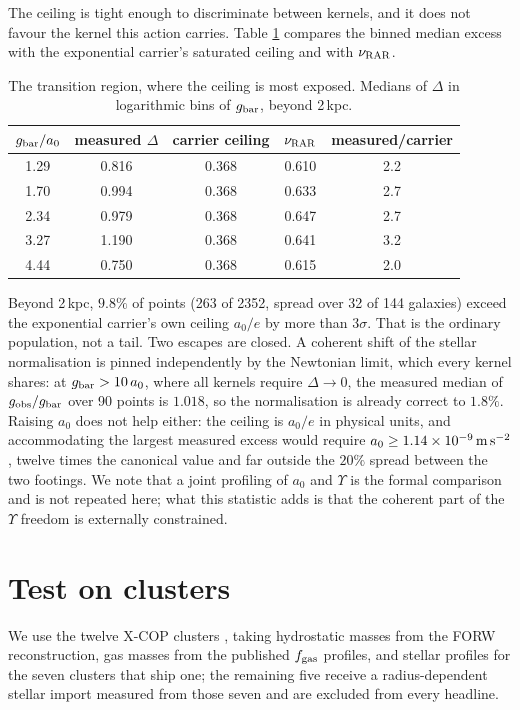 \documentclass[11pt,letterpaper]{article}
\begin{document}
The ceiling is tight enough to discriminate between kernels, and it does not favour the kernel this action carries. Table \ref{tab:trans} compares the binned median excess with the exponential carrier's saturated ceiling and with $\nu_{\rm RAR}$.

\begin{table}[h]\centering
\begin{tabular}{ccccc}\toprule
$g_{\rm bar}/a_0$ & measured $\Delta$ & carrier ceiling & $\nu_{\rm RAR}$ & measured/carrier\\\midrule
1.29 & 0.816 & 0.368 & 0.610 & 2.2\\
1.70 & 0.994 & 0.368 & 0.633 & 2.7\\
2.34 & 0.979 & 0.368 & 0.647 & 2.7\\
3.27 & 1.190 & 0.368 & 0.641 & 3.2\\
4.44 & 0.750 & 0.368 & 0.615 & 2.0\\\bottomrule
\end{tabular}
\caption{The transition region, where the ceiling is most exposed. Medians of $\Delta$ in logarithmic bins of $g_{\rm bar}$, beyond 2\,kpc.}\label{tab:trans}
\end{table}

Beyond 2\,kpc, $9.8\%$ of points (263 of 2352, spread over 32 of 144 galaxies) exceed the exponential carrier's own ceiling $a_0/e$ by more than $3\sigma$. That is the ordinary population, not a tail. Two escapes are closed. A coherent shift of the stellar normalisation is pinned independently by the Newtonian limit, which every kernel shares: at $g_{\rm bar}>10\,a_0$, where all kernels require $\Delta\to0$, the measured median of $g_{\rm obs}/g_{\rm bar}$ over 90 points is $1.018$, so the normalisation is already correct to $1.8\%$. Raising $a_0$ does not help either: the ceiling is $a_0/e$ in physical units, and accommodating the largest measured excess would require $a_0\ge1.14\times10^{-9}\,{\rm m\,s^{-2}}$, twelve times the canonical value and far outside the $20\%$ spread between the two footings. We note that a joint profiling of $a_0$ and $\Upsilon$ is the formal comparison and is not repeated here; what this statistic adds is that the coherent part of the $\Upsilon$ freedom is externally constrained.

\section{Test on clusters}
We use the twelve X-COP clusters \cite{eckert19,ettori19}, taking hydrostatic masses from the FORW reconstruction, gas masses from the published $f_{\rm gas}$ profiles, and stellar profiles for the seven clusters that ship one; the remaining five receive a radius-dependent stellar import measured from those seven and are excluded from every headline.
\end{document}
